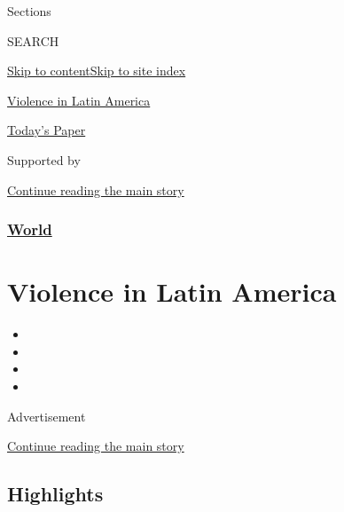 Sections

SEARCH

\protect\hyperlink{site-content}{Skip to
content}\protect\hyperlink{site-index}{Skip to site index}

\href{https://www.nytimes.com/spotlight/violence-in-latin-america}{Violence
in Latin America}

\href{https://myaccount.nytimes.com/auth/login?response_type=cookie\&client_id=vi}{}

\href{https://www.nytimes.com/section/todayspaper}{Today's Paper}

Supported by

\protect\hyperlink{after-sponsor}{Continue reading the main story}

\hypertarget{world}{%
\subsubsection{\texorpdfstring{\href{/section/world}{World}}{World}}\label{world}}

\hypertarget{violence-in-latin-america}{%
\section{Violence in Latin America}\label{violence-in-latin-america}}

\begin{itemize}
\item
\item
\item
\item
\end{itemize}

Advertisement

\protect\hyperlink{after-subheader}{Continue reading the main story}

\hypertarget{highlights}{%
\subsection{Highlights}\label{highlights}}

